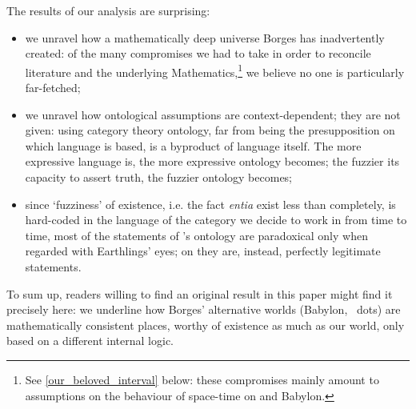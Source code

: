 The results of our analysis are surprising:
\begin{itemize}
	\item we unravel how a mathematically deep universe Borges has inadvertently created: of the many compromises we had to take in order to reconcile literature and the underlying Mathematics,\footnote{See \autoref{our_beloved_interval} below: these compromises mainly amount to assumptions on the behaviour of space-time on \tlon and Babylon.} we believe no one is particularly far-fetched;
	\item we unravel how ontological assumptions are context-dependent; they are not given: using category theory ontology, far from being the presupposition on which language is based, is a byproduct of language itself. The more expressive language is, the more expressive ontology becomes; the fuzzier its capacity to assert truth, the fuzzier ontology becomes;
	\item since `fuzziness' of existence, i.e. the fact \emph{entia} exist less than completely, is hard-coded in the language of the category we decide to work in from time to time, most of the statements of \tlon's ontology are paradoxical only when regarded with Earthlings' eyes; on \tlon they are, instead, perfectly legitimate statements.
\end{itemize}
To sum up, readers willing to find an original result in this paper might find it precisely here: we underline how Borges' alternative worlds (Babylon, \tlon \ dots) are mathematically consistent places, worthy of existence as much as our world, only based on a different internal logic.

